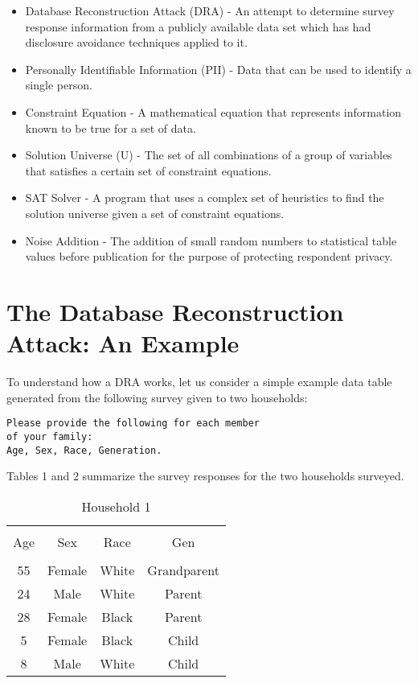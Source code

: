 \documentclass[jou,apacite]{apa6}
\begin{document}
\begin{itemize}
\item Database Reconstruction Attack (DRA) - An attempt to determine survey response information from a publicly available data set which has had disclosure avoidance techniques applied to it.

\item Personally Identifiable Information (PII) - Data that can be used to identify a single person.

\item Constraint Equation - A mathematical equation that represents information known to be true for a set of data.

\item Solution Universe (U) - The set of all combinations of a
group of variables that satisfies a certain set of constraint equations.

\item SAT Solver - A program that uses a complex set of heuristics to find the solution universe given a set of constraint equations.

\item Noise Addition - The addition of small random numbers to statistical table values before publication for the purpose of protecting respondent privacy.
\end{itemize}

\section{The Database Reconstruction Attack: An Example}
To understand how a DRA works, let us consider a simple example data table generated from the following survey given to two households:
\begin{verbatim}
Please provide the following for each member
of your family:
Age, Sex, Race, Generation.
\end{verbatim}
Tables 1 and 2 summarize the survey responses for the two households surveyed.
\begin{table}[!htb]
\caption{Household 1}\label{tab1}
\begin{tabular}{cccc}
\hline\\[-1.5ex]
Age & Sex & Race & Gen \\[0.5ex]
\hline\\[-1.5ex]
55 & Female & White & Grandparent\\[0.5ex]
24 & Male & White & Parent\\[0.5ex]
28 & Female & Black & Parent\\[0.5ex]
5 & Female & Black & Child\\[0.5ex]
8 & Male & White & Child\\[0.5ex]
\hline
\end{tabular}
\end{table}
\end{document}
